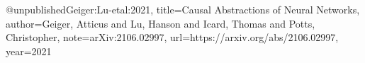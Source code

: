 @unpublished{Geiger:Lu-etal:2021,
    title={Causal Abstractions of Neural Networks},
    author={Geiger, Atticus  and  Lu, Hanson  and  Icard, Thomas  and Potts, Christopher},
    note={arXiv:2106.02997},
    url={https://arxiv.org/abs/2106.02997},
    year={2021}}
